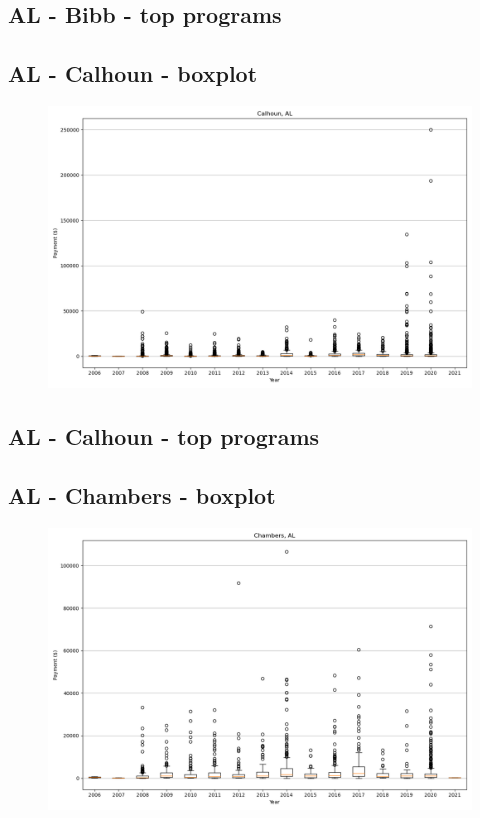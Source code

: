 \subsection*{AL - Bibb - top programs}

\newpage
\subsection*{AL - Calhoun - boxplot}
\begin{figure}[h]
\centering
\includegraphics[width=7in]{../output/boxplots/counties/Calhoun-AL_boxplot.png}
\end{figure}


\subsection*{AL - Calhoun - top programs}

\newpage
\subsection*{AL - Chambers - boxplot}
\begin{figure}[h]
\centering
\includegraphics[width=7in]{../output/boxplots/counties/Chambers-AL_boxplot.png}
\end{figure}


